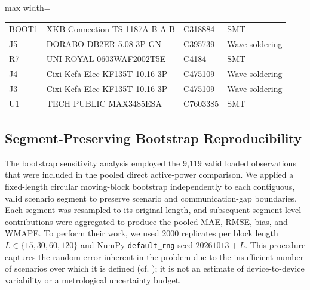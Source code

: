 \documentclass[technologies,article,submit,pdftex,moreauthors]{Definitions/mdpi}
\begin{document}
\begin{table}[H]
\begin{adjustbox}{max width=\textwidth}
\begin{tabular}{p{}p{}p{}p{}}
BOOT1 & XKB Connection TS-1187A-B-A-B & C318884 & SMT \\
J5 & DORABO DB2ER-5.08-3P-GN & C395739 & Wave soldering \\
R7 & UNI-ROYAL 0603WAF2002T5E & C4184 & SMT \\
J4 & Cixi Kefa Elec KF135T-10.16-3P & C475109 & Wave soldering \\
J3 & Cixi Kefa Elec KF135T-10.16-3P & C475109 & Wave soldering \\
U1 & TECH PUBLIC MAX3485ESA & C7603385 & SMT \\
\bottomrule
\end{tabular}
\end{adjustbox}
\end{table}
\FloatBarrier

\subsection{Segment-Preserving Bootstrap Reproducibility}

The bootstrap sensitivity analysis employed the 9,119 valid loaded observations that were included in the pooled direct active-power comparison. We applied a fixed-length circular moving-block bootstrap independently to each contiguous, valid scenario segment to preserve scenario and communication-gap boundaries. Each segment was resampled to its original length, and subsequent segment-level contributions were aggregated to produce the pooled MAE, RMSE, bias, and WMAPE. To perform their work, we used 2000 replicates per block length $L\in \{15,30,60,120\}$ and NumPy \texttt{default\_rng} seed $20261013+L$. This procedure captures the random error inherent in the problem due to the insufficient number of scenarios over which it is defined (cf. \cite{r2_kunsch,r2_politis,r2_gum}); it is not an estimate of device-to-device variability or a metrological uncertainty budget. 
\end{document}

